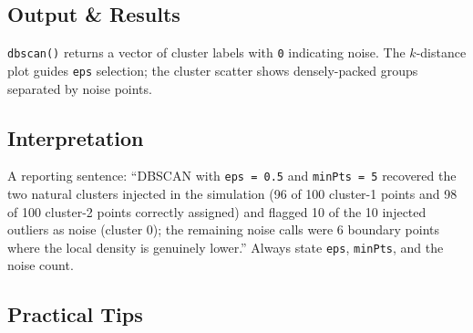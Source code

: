 \documentclass[
]{article}
\newenvironment{Shaded}{\begin{snugshade}}{\end{snugshade}}
\newcommand{\AttributeTok}[1]{\textcolor[rgb]{0.13,0.29,0.53}{#1}}
\newcommand{\DecValTok}[1]{\textcolor[rgb]{0.00,0.00,0.81}{#1}}
\newcommand{\FloatTok}[1]{\textcolor[rgb]{0.00,0.00,0.81}{#1}}
\newcommand{\FunctionTok}[1]{\textcolor[rgb]{0.13,0.29,0.53}{\textbf{#1}}}
\newcommand{\NormalTok}[1]{#1}
\newcommand{\OtherTok}[1]{\textcolor[rgb]{0.56,0.35,0.01}{#1}}
\newcommand{\SpecialCharTok}[1]{\textcolor[rgb]{0.81,0.36,0.00}{\textbf{#1}}}
\newcommand{\StringTok}[1]{\textcolor[rgb]{0.31,0.60,0.02}{#1}}
\begin{document}
\begin{Shaded}
\end{Shaded}

\subsection{Output \& Results}\label{output-results}

\texttt{dbscan()} returns a vector of cluster labels with \texttt{0}
indicating noise. The \(k\)-distance plot guides \texttt{eps} selection;
the cluster scatter shows densely-packed groups separated by noise
points.

\subsection{Interpretation}\label{interpretation}

A reporting sentence: ``DBSCAN with \texttt{eps\ =\ 0.5} and
\texttt{minPts\ =\ 5} recovered the two natural clusters injected in the
simulation (96 of 100 cluster-1 points and 98 of 100 cluster-2 points
correctly assigned) and flagged 10 of the 10 injected outliers as noise
(cluster 0); the remaining noise calls were 6 boundary points where the
local density is genuinely lower.'' Always state \texttt{eps},
\texttt{minPts}, and the noise count.

\subsection{Practical Tips}\label{practical-tips}
\end{document}
